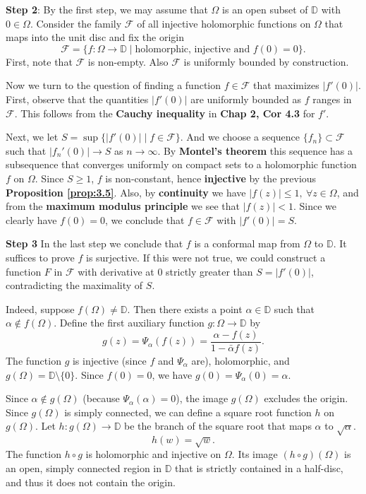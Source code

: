 \documentclass{article}
\begin{document}
\textbf{Step 2}:
By the first step, we may assume that $\Omega$ is an open subset of $\mathbb{D}$ with $0 \in \Omega$. Consider the family $\mathcal{F}$ of all injective holomorphic functions on $\Omega$ that maps into the unit disc and fix the origin
$$\mathcal{F} = \{ f: \Omega \to \mathbb{D} \mid \text{holomorphic, injective and } f(0) = 0 \}.$$
First, note that $\mathcal{F}$ is non-empty. Also $\mathcal{F}$ is uniformly bounded by construction.

Now we turn to the question of finding a function $f \in \mathcal{F}$ that maximizes $|f'(0)|$. First, observe that the quantities $|f'(0)|$ are uniformly bounded as $f$ ranges in $\mathcal{F}$. This follows from the \textbf{Cauchy inequality} in \textbf{Chap 2, Cor 4.3} for $f'$.

Next, we let $S = \sup \{ |f'(0)| \mid f \in \mathcal{F} \}$. And we choose a sequence $\{f_n\} \subset \mathcal{F}$ such that $|f_n'(0)| \to S$ as $n \to \infty$. By \textbf{Montel's theorem} this sequence has a subsequence that converges uniformly on compact sets to a holomorphic function $f$ on $\Omega$. Since $S \ge 1$, $f$ is non-constant, hence \textbf{injective} by the previous \textbf{Proposition \ref{prop:3.5}}.
Also, by \textbf{continuity} we have $|f(z)| \le 1, \ \forall z \in \Omega$, and from the \textbf{maximum modulus principle} we see that $|f(z)| < 1$. Since we clearly have $f(0) = 0$, we conclude that $f \in \mathcal{F}$ with $|f'(0)| = S$.

\textbf{Step 3}
In the last step we conclude that $f$ is a conformal map from $\Omega$ to $\mathbb{D}$. It suffices to prove $f$ is surjective. If this were not true, we could construct a function $F$ in $\mathcal{F}$ with derivative at $0$ strictly greater than $S = |f'(0)|$, contradicting the maximality of $S$.

Indeed, suppose $f(\Omega) \ne \mathbb{D}$. Then there exists a point $\alpha \in \mathbb{D}$ such that $\alpha \notin f(\Omega)$.
Define the first auxiliary function $g: \Omega \to \mathbb{D}$ by
$$g(z) = \Psi_\alpha(f(z)) = \frac{\alpha - f(z)}{1 - \bar{\alpha} f(z)}.$$
The function $g$ is injective (since $f$ and $\Psi_\alpha$ are), holomorphic, and $g(\Omega) = \mathbb{D} \setminus \{0\}$. Since $f(0)=0$, we have $g(0) = \Psi_\alpha(0) = \alpha$.

Since $\alpha \notin g(\Omega)$ (because $\Psi_\alpha(\alpha) = 0$), the image $g(\Omega)$ excludes the origin. Since $g(\Omega)$ is simply connected, we can define a square root function $h$ on $g(\Omega)$. Let $h: g(\Omega) \to \mathbb{D}$ be the branch of the square root that maps $\alpha$ to $\sqrt{\alpha}$.
$$h(w) = \sqrt{w}.$$
The function $h \circ g$ is holomorphic and injective on $\Omega$. Its image $(h \circ g)(\Omega)$ is an open, simply connected region in $\mathbb{D}$ that is strictly contained in a half-disc, and thus it does not contain the origin.
\end{document}
